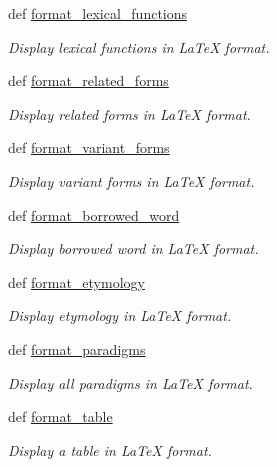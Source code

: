 \begin{DoxyCompactItemize}
def \hyperlink{namespacelmf_1_1src_1_1output_1_1tex_a537739524148dfabf1b8a478dbdc2ab8}{format\+\_\+lexical\+\_\+functions}
\begin{DoxyCompactList}\small\item\em Display lexical functions in La\+Te\+X format. \end{DoxyCompactList}\item 
def \hyperlink{namespacelmf_1_1src_1_1output_1_1tex_a8ec199d60ed9bf1181e3fc2b0f5bfdfd}{format\+\_\+related\+\_\+forms}
\begin{DoxyCompactList}\small\item\em Display related forms in La\+Te\+X format. \end{DoxyCompactList}\item 
def \hyperlink{namespacelmf_1_1src_1_1output_1_1tex_ad480953f36ad10784d7c31ccf6312845}{format\+\_\+variant\+\_\+forms}
\begin{DoxyCompactList}\small\item\em Display variant forms in La\+Te\+X format. \end{DoxyCompactList}\item 
def \hyperlink{namespacelmf_1_1src_1_1output_1_1tex_a83e46c265d9398f923037d98556f8a3a}{format\+\_\+borrowed\+\_\+word}
\begin{DoxyCompactList}\small\item\em Display borrowed word in La\+Te\+X format. \end{DoxyCompactList}\item 
def \hyperlink{namespacelmf_1_1src_1_1output_1_1tex_a8b32c48ab08f6cf19cbf5a6a85afc29e}{format\+\_\+etymology}
\begin{DoxyCompactList}\small\item\em Display etymology in La\+Te\+X format. \end{DoxyCompactList}\item 
def \hyperlink{namespacelmf_1_1src_1_1output_1_1tex_af15fafa4a65e29c0bbbd58fe5309a438}{format\+\_\+paradigms}
\begin{DoxyCompactList}\small\item\em Display all paradigms in La\+Te\+X format. \end{DoxyCompactList}\item 
def \hyperlink{namespacelmf_1_1src_1_1output_1_1tex_add49538268673cc7499172c453a135a7}{format\+\_\+table}
\begin{DoxyCompactList}\small\item\em Display a table in La\+Te\+X format. \end{DoxyCompactList}\item 

\end{DoxyCompactItemize}
